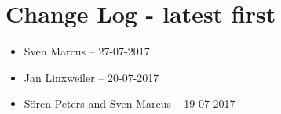 \section{Change Log - \small\textnormal {latest first}}
\begin{itemize}
	\item Sven Marcus – 27-07-2017
	\item Jan Linxweiler – 20-07-2017
	\item Sören Peters and Sven Marcus – 19-07-2017
\end{itemize}